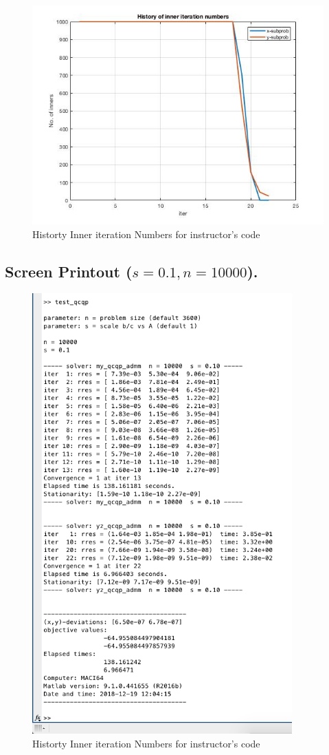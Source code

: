 \begin{figure}[H]
\centering
\includegraphics[width=12cm]{F_4/F_1_4.jpg}
\caption{Historty Inner iteration Numbers for instructor's code}
\end{figure}
\subsection{Screen Printout ($s=0.1,n=10000$).}
\begin{figure}[H]
\centering
\includegraphics[width=10cm]{F_4/F_1_1.png}
\caption{Historty Inner iteration Numbers for instructor's code}
\end{figure}




